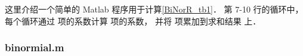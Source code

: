 

这里介绍一个简单的 Matlab 程序用于计算\autoref{BiNorR_tb1}． 第 7-10 行的循环中， 每个循环通过  项的系数计算  项的系数， 并将  项累加到求和结果  上．

\subsubsection{binormial.m}
